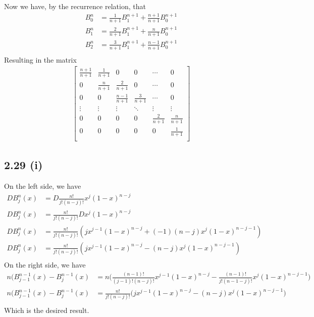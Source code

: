 \documentclass[letterpaper,12pt]{article}
\theoremstyle{definition}
\begin{document}
Now we have, by the recurrence relation, that
\begin{align*}
    B_0^n &= \frac{1}{n+1}B_1^{n+1} + \frac{n+1}{n+1}B_0^{n+1} \\
    B_1^n &= \frac{2}{n+1}B_1^{n+1} + \frac{n}{n+1}B_0^{n+1} \\
    B_2^n &= \frac{3}{n+1}B_1^{n+1} + \frac{n-1}{n+1}B_0^{n+1} \\
\end{align*}
Resulting in the matrix
\begin{align*}
    \begin{bmatrix}
       \frac{n+1}{n+1}&\frac{1}{n+1}&0&0& \cdots & 0 \\
       0&\frac{n}{n+1}&\frac{2}{n+1}&0& \cdots & 0 \\
       0&0&\frac{n-1}{n+1}&\frac{3}{n+1}& \cdots & 0 \\
       \vdots&\vdots&\vdots&\ddots&\vdots&\vdots\\
       0&0&0&0&\frac{2}{n+1}&\frac{n}{n+1}\\
       0&0&0&0&0&\frac{1}{n+1}\\
    \end{bmatrix}
\end{align*}






\subsection*{2.29 (i)}
On the left side, we have
\begin{align*}
    DB_j^n(x) &= D \frac{n!}{j!(n-j)!}x^j(1-x)^{n-j}\\
    DB_j^n(x) &=  \frac{n!}{j!(n-j)!}Dx^j(1-x)^{n-j}\\
    DB_j^n(x) &=  \frac{n!}{j!(n-j)!}(jx^{j-1}(1-x)^{n-j} + (-1)(n-j)x^j(1-x)^{n-j-1})\\
    DB_j^n(x) &=  \frac{n!}{j!(n-j)!}(jx^{j-1}(1-x)^{n-j} - (n-j)x^j(1-x)^{n-j-1})\\
\end{align*}
On the right side, we have
\begin{align*}
    n(B_{j-1}^{n-1}(x) - B^{n-1}_j(x) &= n \Big( \frac{(n-1)!}{(j-1)!(n-j)!}x^{j-1}(1-x)^{n-j} - \frac{(n-1)!}{j!(n-1-j)!}x^j(1-x)^{n-j-1} \Big) \\
    n(B_{j-1}^{n-1}(x) - B^{n-1}_j(x) &= \frac{n!}{j!(n-j)!} \Big( jx^{j-1}(1-x)^{n-j} - (n-j)x^j(1-x)^{n-j-1} \Big) \\
\end{align*}
Which is the desired result.
\end{document}
